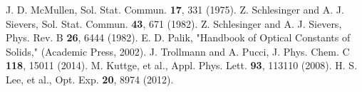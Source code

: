 \documentclass[a4,10truept]{jsarticle}
\begin{document}
%
%
\vspace{-0.2em}
\begin{thebibliography}{9}
\vspace{-0.5em}
 J. D. McMullen, Sol. Stat. Commun. {\bf 17}, 331 (1975).
 Z. Schlesinger and A. J. Sievers, Sol. Stat. Commun. {\bf 43}, 671 (1982).
 Z. Schlesinger and A. J. Sievers, Phys. Rev. B {\bf 26}, 6444 (1982).
 E. D. Palik, "Handbook of Optical Constants of Solids," (Academic Press, 2002).
 J. Trollmann and A. Pucci, J. Phys. Chem. C {\bf 118}, 15011 (2014).
 M. Kuttge, et al., Appl. Phys. Lett. {\bf 93}, 113110 (2008).
 H. S. Lee, et al., Opt. Exp. {\bf 20}, 8974 (2012).
\end{thebibliography}
\end{document}
